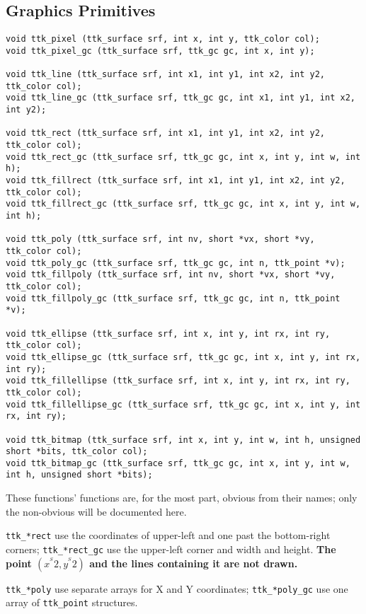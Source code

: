 \documentclass[12pt,letterpaper]{report}
\begin{document}
\subsection{Graphics Primitives}
{\footnotesize
\begin{verbatim}
void ttk_pixel (ttk_surface srf, int x, int y, ttk_color col);
void ttk_pixel_gc (ttk_surface srf, ttk_gc gc, int x, int y);

void ttk_line (ttk_surface srf, int x1, int y1, int x2, int y2, ttk_color col);
void ttk_line_gc (ttk_surface srf, ttk_gc gc, int x1, int y1, int x2, int y2);

void ttk_rect (ttk_surface srf, int x1, int y1, int x2, int y2, ttk_color col);
void ttk_rect_gc (ttk_surface srf, ttk_gc gc, int x, int y, int w, int h);
void ttk_fillrect (ttk_surface srf, int x1, int y1, int x2, int y2, ttk_color col);
void ttk_fillrect_gc (ttk_surface srf, ttk_gc gc, int x, int y, int w, int h);

void ttk_poly (ttk_surface srf, int nv, short *vx, short *vy, ttk_color col);
void ttk_poly_gc (ttk_surface srf, ttk_gc gc, int n, ttk_point *v);
void ttk_fillpoly (ttk_surface srf, int nv, short *vx, short *vy, ttk_color col);
void ttk_fillpoly_gc (ttk_surface srf, ttk_gc gc, int n, ttk_point *v);

void ttk_ellipse (ttk_surface srf, int x, int y, int rx, int ry, ttk_color col);
void ttk_ellipse_gc (ttk_surface srf, ttk_gc gc, int x, int y, int rx, int ry);
void ttk_fillellipse (ttk_surface srf, int x, int y, int rx, int ry, ttk_color col);
void ttk_fillellipse_gc (ttk_surface srf, ttk_gc gc, int x, int y, int rx, int ry);

void ttk_bitmap (ttk_surface srf, int x, int y, int w, int h, unsigned short *bits, ttk_color col);
void ttk_bitmap_gc (ttk_surface srf, ttk_gc gc, int x, int y, int w, int h, unsigned short *bits);
\end{verbatim}
}

These functions' functions are, for the most part,
obvious from their names; only the non-obvious will be documented here.

\verb|ttk_*rect| use the coordinates of upper-left and one past the bottom-right corners; \verb|ttk_*rect_gc| use
the upper-left corner and width and height. {\bf The point $(x^^S2, y^^S2)$ and the lines containing it are not drawn.}

\verb|ttk_*poly| use separate arrays for X and Y coordinates; \verb|ttk_*poly_gc| use one array of
\verb|ttk_point| structures.
\end{document}
